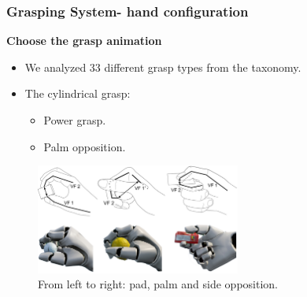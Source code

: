 \documentclass{beamer}
\theoremstyle{remark}
\theoremstyle{plain}
\begin{document}
\begin{frame}
\frametitle{Grasping System- hand configuration}

\textbf{Choose the grasp animation}

\begin{itemize}
	\item We analyzed 33 different grasp types from the taxonomy.
	\item The cylindrical grasp:
	\begin{itemize}
		\item Power grasp.
		\item Palm opposition.
	\end{itemize}
\end{itemize}

\begin{figure}
	\centering
	\includegraphics[width=0.6\textwidth]{images/grasp_taxonomy}
	\caption{From left to right: pad, palm and side opposition.}
\end{figure}
\end{frame}
\end{document}
